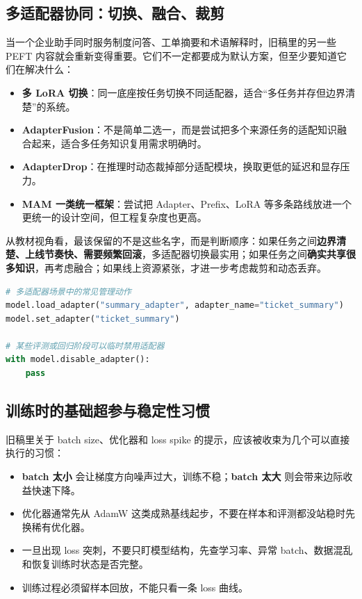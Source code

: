 \subsection{多适配器协同：切换、融合、裁剪}
当一个企业助手同时服务制度问答、工单摘要和术语解释时，旧稿里的另一些 PEFT 内容就会重新变得重要。它们不一定都要成为默认方案，但至少要知道它们在解决什么：
\begin{itemize}
  \item \textbf{多 LoRA 切换}：同一底座按任务切换不同适配器，适合“多任务并存但边界清楚”的系统。
  \item \textbf{AdapterFusion}：不是简单二选一，而是尝试把多个来源任务的适配知识融合起来，适合多任务知识复用需求明确时。
  \item \textbf{AdapterDrop}：在推理时动态裁掉部分适配模块，换取更低的延迟和显存压力。
  \item \textbf{MAM 一类统一框架}：尝试把 Adapter、Prefix、LoRA 等多条路线放进一个更统一的设计空间，但工程复杂度也更高。
\end{itemize}

从教材视角看，最该保留的不是这些名字，而是判断顺序：如果任务之间\textbf{边界清楚、上线节奏快、需要频繁回滚}，多适配器切换最实用；如果任务之间\textbf{确实共享很多知识}，再考虑融合；如果线上资源紧张，才进一步考虑裁剪和动态丢弃。

\begin{lstlisting}[language=Python]
# 多适配器场景中的常见管理动作
model.load_adapter("summary_adapter", adapter_name="ticket_summary")
model.set_adapter("ticket_summary")

# 某些评测或回归阶段可以临时禁用适配器
with model.disable_adapter():
    pass
\end{lstlisting}

\subsection{训练时的基础超参与稳定性习惯}
旧稿里关于 batch size、优化器和 loss spike 的提示，应该被收束为几个可以直接执行的习惯：
\begin{itemize}
  \item \textbf{batch 太小} 会让梯度方向噪声过大，训练不稳；\textbf{batch 太大} 则会带来边际收益快速下降。
  \item 优化器通常先从 AdamW 这类成熟基线起步，不要在样本和评测都没站稳时先换稀有优化器。
  \item 一旦出现 loss 突刺，不要只盯模型结构，先查学习率、异常 batch、数据混乱和恢复训练时状态是否完整。
  \item 训练过程必须留样本回放，不能只看一条 loss 曲线。
\end{itemize}

